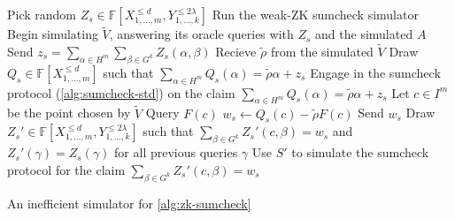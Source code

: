 \documentclass[english,12pt]{reedthesis}
\theoremstyle{plain}
\theoremstyle{definition}
\theoremstyle{remark}
\begin{document}
\begin{algorithm}[htbp]
  Pick random
  $Z_{s} \in \mathbb{F}[X_{1, \ldots, m}^{\le d}, Y_{1, \ldots, k}^{\le 2\lambda}]$\;
  Run the weak-ZK sumcheck simulator\; %
  Begin simulating $\tilde{V}$, answering its oracle queries with $Z_{s}$ and
  the simulated $A$\;
  Send $z_{s} = \sum_{\alpha \in H^{m}}\sum_{\beta \in G^{k}}Z_{s}(\alpha, \beta)$\;
  Recieve $\tilde{\rho}$ from the simulated $\tilde{V}$\;
  Draw $Q_{s} \in \mathbb{F}[X_{1, \ldots, m}^{\le d}]$ such that
  $\sum_{\alpha \in H^{m}}Q_{s}(\alpha) = \tilde{\rho}\alpha + z_{s}$\;
  Engage in the sumcheck protocol (\cref{alg:sumcheck-std}) on the claim
  $\sum_{\alpha \in H^{m}}Q_{s}(\alpha) = \tilde{\rho}\alpha + z_{s}$\;
  Let $c \in I^{m}$ be the point chosen by $\tilde{V}$\;
  Query $F(c)$\;
  $w_{s} \leftarrow Q_{s}(c) - \tilde{\rho}F(c)$\;
  Send $w_{s}$\;
  Draw $Z_{s}' \in \mathbb{F}[X_{1, \ldots, m}^{\le d}, Y_{1, \ldots, k}^{\le 2\lambda}]$ such that
  $\sum_{\beta \in G^{k}}Z_{s}'(c, \beta) = w_{s}$ and $Z_{s}'(\gamma) = Z_{s}(\gamma)$ for all
  previous queries $\gamma$\;
  Use $S'$ to simulate the sumcheck protocol for the claim
  $\sum_{\beta \in G^{k}}Z_{s}'(c, \beta) = w_{s}$\;
  \;
  \caption{An inefficient simulator for
    \cref{alg:zk-sumcheck}~\cite[p.\ 15:33]{CFGS22}}\label{alg:zk-sumcheck-sim}
\end{algorithm}
\end{document}
